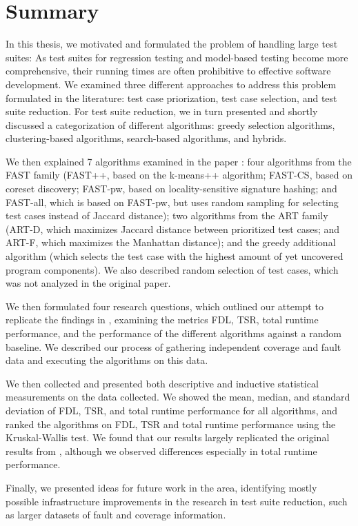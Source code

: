 
\chapter{Summary}\label{chapter:summary}

In this thesis, we motivated and formulated the problem of handling large
test suites: As test suites for regression testing and model-based testing
become more comprehensive, their running times are often prohibitive to
effective software development. We examined three different approaches to
address this problem formulated in the literature: test case priorization,
test case selection, and test suite reduction. For test suite reduction,
we in turn presented and shortly discussed a categorization of different
algorithms: greedy selection algorithms, clustering-based algorithms,
search-based algorithms, and hybrids.

We then explained 7 algorithms examined in the paper
\cite{cruciani2019scalable}: four algorithms from the FAST family (FAST++,
based on the k-means++ algorithm; FAST-CS, based on coreset discovery;
FAST-pw, based on locality-sensitive signature hashing; and FAST-all,
which is based on FAST-pw, but uses random sampling for selecting test
cases instead of Jaccard distance); two algorithms from the ART family
(ART-D, which maximizes Jaccard distance between prioritized test cases;
and ART-F, which maximizes the Manhattan distance); and the greedy
additional algorithm (which selects the test case with the highest amount
of yet uncovered program components). We also described random selection
of test cases, which was not analyzed in the original paper.

We then formulated four research questions, which outlined our attempt
to replicate the findings in \cite{cruciani2019scalable}, examining
the metrics FDL, TSR, total runtime performance, and the performance
of the different algorithms against a random baseline. We described our
process of gathering independent coverage and fault data and executing
the algorithms on this data.

We then collected and presented both descriptive and inductive statistical
measurements on the data collected. We showed the mean, median, and
standard deviation of FDL, TSR, and total runtime performance for all
algorithms, and ranked the algorithms on FDL, TSR and total runtime
performance using the Kruskal-Wallis test. We found that our results largely
replicated the original results from \cite{cruciani2019scalable}, although
we observed differences especially in total runtime performance.

Finally, we presented ideas for future work in the area, identifying
mostly possible infrastructure improvements in the research in test suite
reduction, such as larger datasets of fault and coverage information.
